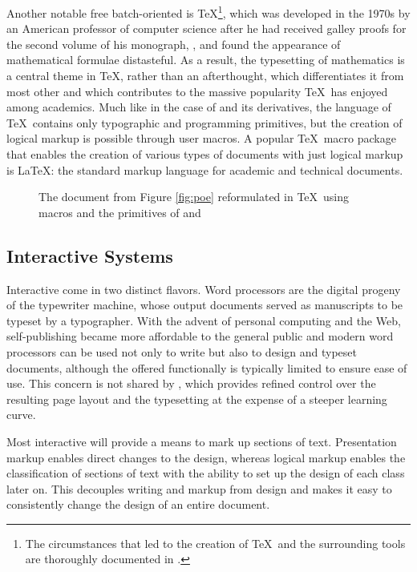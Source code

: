 Another notable free batch-oriented  is
\TeX{}\footnote{
  The circumstances that led to the creation of \TeX\ and the surrounding tools
  are thoroughly documented in .
}, which was developed in the 1970s by an American professor of computer science
 after he had received galley proofs for the second volume
of his monograph, , and found the
appearance of mathematical formulae distasteful. As a result, the typesetting of
mathematics is a central theme in \TeX, rather than an afterthought, which
differentiates it from most other  and which contributes to the
massive popularity \TeX\ has enjoyed among academics. Much like in the case of
 and its derivatives, the language of \TeX\ contains only
typographic and programming primitives, but the creation of logical markup is
possible through user macros. A popular \TeX\ macro package that enables the
creation of various types of documents with just logical markup is
\LaTeX{}: the standard markup language for academic and
technical documents.

\begin{figure}
  \caption{The document from Figure \ref{fig:poe} reformulated in \TeX\ using
     macros and the primitives of  and
    }
\end{figure}

\subsection{Interactive Systems}
Interactive  come in two distinct flavors. Word processors
 are the digital progeny of the
typewriter machine, whose output documents served as manuscripts to be typeset
by a typographer. With the advent of personal computing and the Web,
self-publishing became more affordable to the general public and modern word
processors can be used not only to write but also to design and typeset
documents, although the offered functionally is typically limited to ensure ease
of use. This concern is not shared by , which provides
refined control over the resulting page layout and the typesetting at the
expense of a steeper learning curve.

Most interactive  will provide a means to mark up sections of text.
Presentation markup enables direct changes to the design, whereas logical markup
enables the classification of sections of text with the ability to set up the
design of each class later on. This decouples writing and markup from design and
makes it easy to consistently change the design of an entire document.

